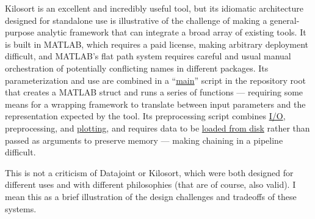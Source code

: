 Kilosort is an excellent and incredibly useful tool, but its idiomatic
architecture designed for standalone use is illustrative of the
challenge of making a general-purpose analytic framework that can
integrate a broad array of existing tools. It is built in MATLAB, which
requires a paid license, making arbitrary deployment difficult, and
MATLAB's flat path system requires careful and usual manual
orchestration of potentially conflicting names in different packages.
Its parameterization and use are combined in a
``\href{https://github.com/MouseLand/Kilosort/blob/db3a3353d9a374ea2f71674bbe443be21986c82c/main_kilosort3.m}{main}''
script in the repository root that creates a MATLAB struct and runs a
series of functions --- requiring some means for a wrapping framework to
translate between input parameters and the representation expected by
the tool. Its preprocessing script combines
\href{https://github.com/MouseLand/Kilosort/blob/a1fccd9abf13ce5dc3340fae8050f9b1d0f8ab7a/preProcess/datashift.m\#L74-L77}{I/O},
preprocessing, and
\href{https://github.com/MouseLand/Kilosort/blob/a1fccd9abf13ce5dc3340fae8050f9b1d0f8ab7a/preProcess/datashift.m\#L57-L68}{plotting},
and requires data to be
\href{https://github.com/MouseLand/Kilosort/blob/a1fccd9abf13ce5dc3340fae8050f9b1d0f8ab7a/preProcess/preprocessDataSub.m\#L82-L84}{loaded
from disk} rather than passed as arguments to preserve memory --- making
chaining in a pipeline difficult.

This is not a criticism of Datajoint or Kilosort, which were both
designed for different uses and with different philosophies (that are of
course, also valid). I mean this as a brief illustration of the design
challenges and tradeoffs of these systems.

